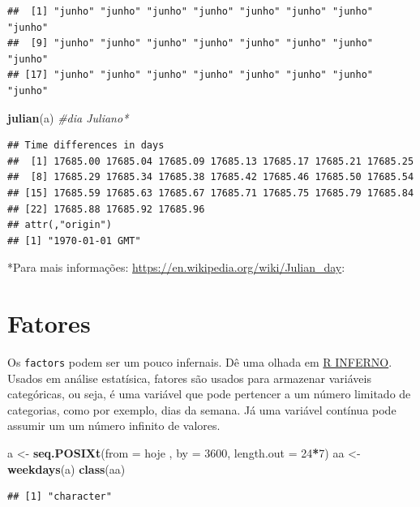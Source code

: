 \documentclass[]{book}
\newenvironment{Shaded}{\begin{snugshade}}{\end{snugshade}}
\newcommand{\KeywordTok}[1]{\textcolor[rgb]{0.13,0.29,0.53}{\textbf{#1}}}
\newcommand{\DataTypeTok}[1]{\textcolor[rgb]{0.13,0.29,0.53}{#1}}
\newcommand{\DecValTok}[1]{\textcolor[rgb]{0.00,0.00,0.81}{#1}}
\newcommand{\StringTok}[1]{\textcolor[rgb]{0.31,0.60,0.02}{#1}}
\newcommand{\CommentTok}[1]{\textcolor[rgb]{0.56,0.35,0.01}{\textit{#1}}}
\newcommand{\OperatorTok}[1]{\textcolor[rgb]{0.81,0.36,0.00}{\textbf{#1}}}
\newcommand{\NormalTok}[1]{#1}
\theoremstyle{definition}
\theoremstyle{definition}
\theoremstyle{definition}
\theoremstyle{remark}
\begin{document}
\begin{verbatim}
##  [1] "junho" "junho" "junho" "junho" "junho" "junho" "junho" "junho"
##  [9] "junho" "junho" "junho" "junho" "junho" "junho" "junho" "junho"
## [17] "junho" "junho" "junho" "junho" "junho" "junho" "junho" "junho"
\end{verbatim}

\begin{Shaded}
\begin{Highlighting}[]
\KeywordTok{julian}\NormalTok{(a) }\CommentTok{#dia Juliano*}
\end{Highlighting}
\end{Shaded}

\begin{verbatim}
## Time differences in days
##  [1] 17685.00 17685.04 17685.09 17685.13 17685.17 17685.21 17685.25
##  [8] 17685.29 17685.34 17685.38 17685.42 17685.46 17685.50 17685.54
## [15] 17685.59 17685.63 17685.67 17685.71 17685.75 17685.79 17685.84
## [22] 17685.88 17685.92 17685.96
## attr(,"origin")
## [1] "1970-01-01 GMT"
\end{verbatim}

*Para mais informações: \url{https://en.wikipedia.org/wiki/Julian_day}:

\section{Fatores}\label{fatores}

Os \texttt{factors} podem ser um pouco infernais. Dê uma olhada em
\href{http://www.burns-stat.com/documents/books/the-r-inferno/}{R
INFERNO}. Usados em análise estatísica, fatores são usados para
armazenar variáveis categóricas, ou seja, é uma variável que pode
pertencer a um número limitado de categorias, como por exemplo, dias da
semana. Já uma variável contínua pode assumir um um número infinito de
valores.

\begin{Shaded}
\begin{Highlighting}[]
\NormalTok{a <-}\StringTok{ }\KeywordTok{seq.POSIXt}\NormalTok{(}\DataTypeTok{from =}\NormalTok{ hoje , }\DataTypeTok{by =} \DecValTok{3600}\NormalTok{, }\DataTypeTok{length.out =} \DecValTok{24}\OperatorTok{*}\DecValTok{7}\NormalTok{)}
\NormalTok{aa <-}\StringTok{ }\KeywordTok{weekdays}\NormalTok{(a)}
\KeywordTok{class}\NormalTok{(aa)}
\end{Highlighting}
\end{Shaded}

\begin{verbatim}
## [1] "character"
\end{verbatim}
\end{document}

